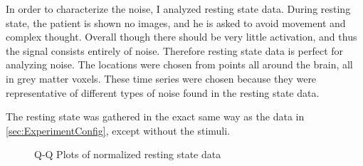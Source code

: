 In order to characterize the noise, I analyzed resting state data.
During resting state, the patient is shown no images, and he is asked
to avoid movement and complex thought.  Overall though there should be 
very little activation, and thus the signal consists entirely of noise. 
Therefore resting state data is perfect for analyzing noise. 
The locations were chosen from points all around the brain, 
all in grey matter voxels. These time
series were chosen because they were representative of different types
of noise found in the resting state data.

The resting state was gathered in the exact same way as the data in 
\autoref{sec:ExperimentConfig}, except without the stimuli.

\begin{figure}
\centering
{}


\caption{Q-Q Plots of normalized resting state data}
\label{fig:QQDC}
\end{figure}

